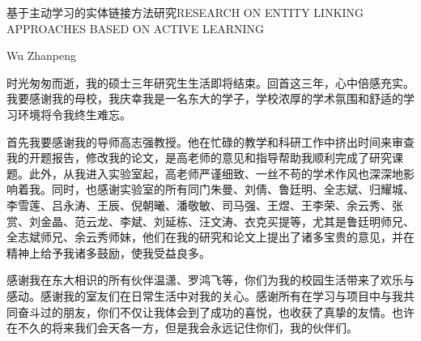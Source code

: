\documentclass[nomlist,masters,openany]{seuthesix}
\begin{document}
\title{\quad}{基于主动学习的实体链接方法研究}{\quad}{RESEARCH ON ENTITY LINKING APPROACHES BASED ON ACTIVE LEARNING}
\author{吴展鹏}{Wu Zhanpeng}
\makebigcover
\makecover


\tableofcontents
\listofothers

\mainmatter











\acknowledgement
时光匆匆而逝，我的硕士三年研究生生活即将结束。回首这三年，心中倍感充实。我要感谢我的母校，我庆幸我是一名东大的学子，学校浓厚的学术氛围和舒适的学习环境将令我终生难忘。

首先我要感谢我的导师高志强教授。他在忙碌的教学和科研工作中挤出时间来审查我的开题报告，修改我的论文，是高老师的意见和指导帮助我顺利完成了研究课题。此外，从我进入实验室起，高老师严谨细致、一丝不苟的学术作风也深深地影响着我。同时，也感谢实验室的所有同门朱曼、刘倩、鲁廷明、全志斌、归耀城、李雪莲、吕永涛、王辰、倪朝曦、潘敬敏、司马强、王煜、王李荣、余云秀、张赏、刘金晶、范云龙、李斌、刘延栋、汪文涛、衣克买提等，尤其是鲁廷明师兄、全志斌师兄、余云秀师妹，他们在我的研究和论文上提出了诸多宝贵的意见，并在精神上给予我诸多鼓励，使我受益良多。

感谢我在东大相识的所有伙伴温潇、罗鸿飞等，你们为我的校园生活带来了欢乐与感动。感谢我的室友们在日常生活中对我的关心。感谢所有在学习与项目中与我共同奋斗过的朋友，你们不仅让我体会到了成功的喜悦，也收获了真挚的友情。也许在不久的将来我们会天各一方，但是我会永远记住你们，我的伙伴们。
\end{document}
